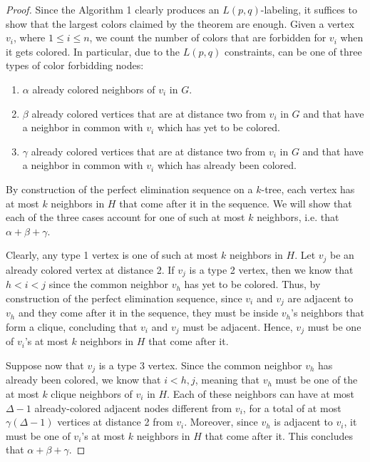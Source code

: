 \documentclass[12pt,a4paper]{article}
\begin{document}
	\begin{proof}
		Since the Algorithm 1 clearly produces an $L(p,q)$-labeling, it suffices to show that the largest colors claimed by the theorem are enough. Given a vertex $v_i$, where $1 \leq i \leq n$, we count the number of colors that are forbidden for $v_i$ when it gets colored. In particular, due to the $L(p,q)$ constraints,  can be one of three types of color forbidding nodes:
		\begin{enumerate}
			\item $\alpha$ already colored neighbors of $v_i$ in $G$.
			\item $\beta$ already colored vertices that are at distance two from $v_i$ in $G$ and that have a neighbor in common with $v_i$ which has yet to be colored.
			\item $\gamma$ already colored vertices that are at distance two from $v_i$ in $G$ and that have a neighbor in common with $v_i$ which has already been colored.
		\end{enumerate}

		By construction of the perfect elimination sequence on a $k$-tree, each vertex has at most $k$ neighbors in $H$ that come after it in the sequence. We will show that each of the three cases account for one of such at most $k$ neighbors, i.e. that $\alpha + \beta + \gamma$.
		
		Clearly, any type 1 vertex is one of such at most $k$ neighbors in $H$. Let $v_j$ be an already colored vertex at distance 2. If $v_j$ is a type 2 vertex, then we know that $h < i < j$ since the common neighbor $v_h$ has yet to be colored. Thus, by construction of the perfect elimination sequence, since $v_i$ and $v_j$ are adjacent to $v_h$ and they come after it in the sequence, they must be inside $v_h$'s neighbors that form a clique, concluding that $v_i$ and $v_j$ must be adjacent. Hence, $v_j$ must be one of $v_i$'s at most $k$ neighbors in $H$ that come after it.

		Suppose now that $v_j$ is a type 3 vertex. Since the common neighbor $v_h$ has already been colored, we know that $i < h, j$, meaning that $v_h$ must be one of the at most $k$ clique neighbors of $v_i$ in $H$. Each of these neighbors can have at most $\Delta-1$ already-colored adjacent nodes different from $v_i$, for a total of at most $\gamma(\Delta-1)$ vertices at distance 2 from $v_i$. Moreover, since $v_h$ is adjacent to $v_i$, it must be one of $v_i$'s at most $k$ neighbors in $H$ that come after it. This concludes that $\alpha + \beta + \gamma$.
		

\end{proof}
\end{document}
